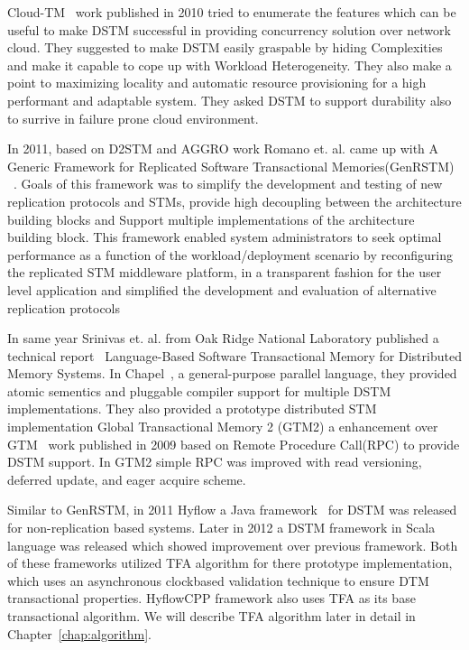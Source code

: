 \documentclass[12pt,english]{report}
\begin{document}
Cloud-TM~\cite{Romano:2010:CHC:1773912.1773914} work published in 2010 tried to enumerate the features which can be useful to make DSTM successful in providing concurrency solution over network cloud. They suggested to make DSTM easily graspable by hiding Complexities and make it capable to cope up with Workload Heterogeneity. They also make a point to maximizing locality and automatic resource provisioning for a high performant and adaptable system. They asked DSTM to support durability also to surrive in failure prone cloud environment. 

In 2011, based on D2STM and AGGRO work Romano et. al. came up with A Generic Framework for Replicated Software Transactional Memories(GenRSTM) ~\cite{GenRSTM:6038614}. Goals of this framework was to simplify the development and testing of new replication protocols and STMs, provide high decoupling between the architecture building blocks and Support multiple implementations of the architecture building block. This framework enabled system administrators to seek optimal performance as a function of the workload/deployment scenario by reconfiguring the replicated STM middleware platform, in a transparent fashion for the
user level application and simplified the development and evaluation of alternative replication protocols

In same year Srinivas et. al. from Oak Ridge National Laboratory published a technical report~\cite{sridharan2011scalable} Language-Based Software Transactional Memory for Distributed Memory Systems. In Chapel~\cite{chapel:Language}, a general-purpose parallel language, they provided atomic sementics and pluggable compiler support for multiple DSTM implementations. They also provided a prototype distributed STM implementation Global Transactional Memory 2 (GTM2) a enhancement over GTM~\cite{sridharan2009scalable} work published in 2009 based on Remote Procedure Call(RPC) to provide DSTM  support. In GTM2 simple RPC was improved with read versioning, deferred update, and eager acquire scheme.

Similar to GenRSTM, in 2011 Hyflow a Java framework~\cite{Saad:2011:HHP:1996130.1996167} for DSTM was released for non-replication based systems. Later in 2012 a DSTM framework in Scala language was released which showed improvement over previous framework. Both of these frameworks utilized TFA algorithm for there prototype implementation, which uses an asynchronous clockbased validation technique to ensure DTM transactional properties. HyflowCPP framework also uses TFA as its base transactional algorithm. We will describe TFA algorithm later in detail in Chapter~\ref{chap:algorithm}.
\end{document}
